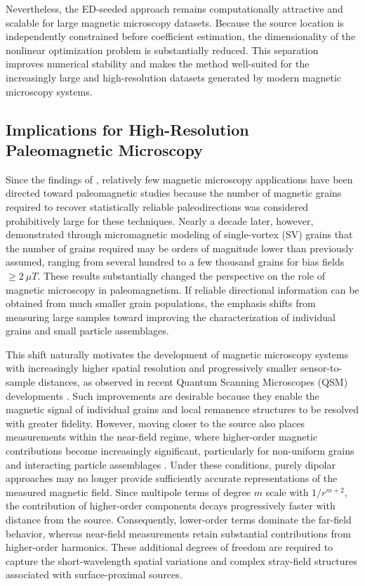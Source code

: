 Nevertheless, the ED-seeded approach remains computationally attractive and scalable for large magnetic microscopy datasets. Because the source location is independently constrained before coefficient estimation, the dimensionality of the nonlinear optimization problem is substantially reduced. This separation improves numerical stability and makes the method well-suited for the increasingly large and high-resolution datasets generated by modern magnetic microscopy systems.

\subsection{Implications for High-Resolution Paleomagnetic Microscopy}

Since the findings of \citet{Berndt2016}, relatively few magnetic microscopy applications have been directed toward paleomagnetic studies because the number of magnetic grains required to recover statistically reliable paleodirections was considered prohibitively large for these techniques. Nearly a decade later, however, \citet{Bellon2025a} demonstrated through micromagnetic modeling of single-vortex (SV) grains that the number of grains required may be orders of magnitude lower than previously assumed, ranging from several hundred to a few thousand grains for bias fields $\geq 2~\mu T$. These results substantially changed the perspective on the role of magnetic microscopy in paleomagnetism. If reliable directional information can be obtained from much smaller grain populations, the emphasis shifts from measuring large samples toward improving the characterization of individual grains and small particle assemblages.  

This shift naturally motivates the development of magnetic microscopy systems with increasingly higher spatial resolution and progressively smaller sensor-to-sample distances, as observed in recent Quantum Scanning Microscopes (QSM) developments \citep[\textit{e.g.}][]{Ahmed2026}. Such improvements are desirable because they enable the magnetic signal of individual grains and local remanence structures to be resolved with greater fidelity. However, moving closer to the source also places measurements within the near-field regime, where higher-order magnetic contributions become increasingly significant, particularly for non-uniform grains and interacting particle assemblages \citep{Bellon2026, CortesOrtuno2022, CortesOrtuno2021}.  Under these conditions, purely dipolar approaches may no longer provide sufficiently accurate representations of the measured magnetic field. Since multipole terms of degree $m$ scale with $1/r^{m+2}$, the contribution of higher-order components decays progressively faster with distance from the source. Consequently, lower-order terms dominate the far-field behavior, whereas near-field measurements retain substantial contributions from higher-order harmonics. These additional degrees of freedom are required to capture the short-wavelength spatial variations and complex stray-field structures associated with surface-proximal sources.

